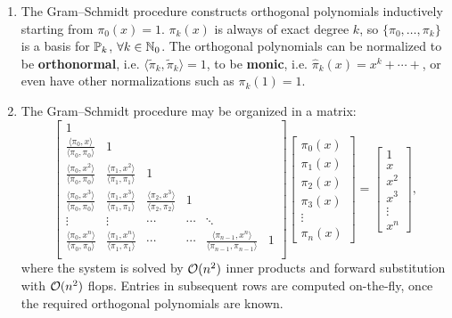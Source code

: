 \begin{remark}
\begin{enumerate}
\item The Gram--Schmidt procedure constructs orthogonal polynomials inductively starting from $\pi_0(x) = 1$. $\pi_k(x)$ is always of exact degree $k$, so $\{\pi_0,\ldots,\pi_k\}$ is a basis for $\P_k$, $\forall k\in\N_0$. The orthogonal polynomials can be normalized to be {\bf orthonormal}, i.e. $\langle\tilde{\pi}_k,\tilde{\pi}_k\rangle = 1$, to be {\bf monic}, i.e. $\hat{\pi}_k(x) = x^k + \cdots +$, or even have other normalizations such as $\pi_k(1)=1$.
\item The Gram--Schmidt procedure may be organized in a matrix:
\[
\begin{bmatrix}
1\\
\frac{\langle \pi_0, x\rangle}{\langle \pi_0,\pi_0\rangle} & 1\\
\frac{\langle \pi_0, x^2\rangle}{\langle \pi_0,\pi_0\rangle} & \frac{\langle \pi_1, x^2\rangle}{\langle \pi_1,\pi_1\rangle} & 1\\
\frac{\langle \pi_0, x^3\rangle}{\langle \pi_0,\pi_0\rangle} & \frac{\langle \pi_1, x^3\rangle}{\langle \pi_1,\pi_1\rangle} & \frac{\langle \pi_2, x^3\rangle}{\langle \pi_2,\pi_2\rangle} & 1\\
\vdots & \vdots & \cdots & \cdots & \ddots\\
\frac{\langle \pi_0, x^n\rangle}{\langle \pi_0,\pi_0\rangle} & \frac{\langle \pi_1, x^n\rangle}{\langle \pi_1,\pi_1\rangle} & \cdots & \cdots & \frac{\langle \pi_{n-1}, x^n\rangle}{\langle \pi_{n-1},\pi_{n-1}\rangle} & 1\\
\end{bmatrix}
\begin{bmatrix}
\pi_0(x)\\\pi_1(x)\\\pi_2(x)\\\pi_3(x)\\\vdots\\\pi_n(x)
\end{bmatrix}
=
\begin{bmatrix}
1\\x\\x^2\\x^3\\\vdots\\x^n
\end{bmatrix},
\]
where the system is solved by $\OO(n^2)$ inner products and forward substitution with $\OO(n^2)$ flops. Entries in subsequent rows are computed on-the-fly, once the required orthogonal polynomials are known.
\end{enumerate}
\end{remark}

